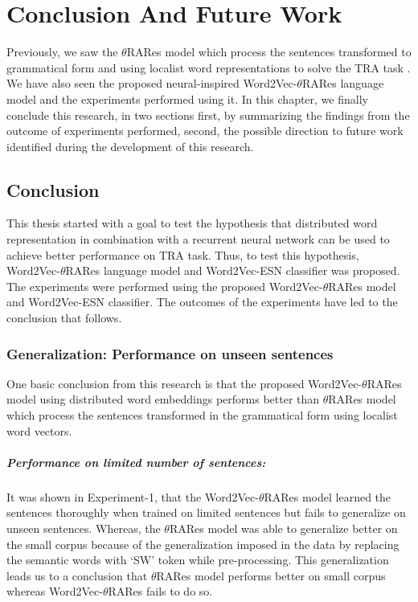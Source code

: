 \chapter{Conclusion And Future Work}\label{conclusion}

Previously, we saw the $\theta$RARes model which process the sentences transformed to grammatical form and using localist word representations to solve the TRA task \cite{xavier:2013:RT}. We have also seen the proposed neural-inspired Word2Vec-$\theta$RARes language model and the experiments performed using it. In this chapter, we finally conclude this research, in two sections first, by summarizing the findings from the outcome of experiments performed, second, the possible direction to future work identified during the development of this research.

\section{Conclusion}

This thesis started with a goal to test the hypothesis that distributed word representation in combination with a recurrent neural network can be used to achieve better performance on TRA task. Thus, to test this hypothesis, Word2Vec-$\theta$RARes language model and Word2Vec-ESN classifier was proposed. The experiments were performed using the proposed Word2Vec-$\theta$RARes model and Word2Vec-ESN classifier. The outcomes of the experiments have led to the conclusion that follows.

\subsection{Generalization: Performance on unseen sentences}

One basic conclusion from this research is that the proposed Word2Vec-$\theta$RARes model using distributed word embeddings performs better than $\theta$RARes model which process the sentences transformed in the grammatical form using localist word vectors.

\paragraph{Performance on limited number of sentences:} It was shown in Experiment-1, that the Word2Vec-$\theta$RARes model learned the sentences thoroughly when trained on limited sentences but fails to generalize on unseen sentences. Whereas, the  $\theta$RARes model was able to generalize better on the small corpus because of the generalization imposed in the data by replacing the semantic words with `SW' token while pre-processing. This generalization leads us to a conclusion that $\theta$RARes model performs better on small corpus whereas Word2Vec-$\theta$RARes fails to do so. 

